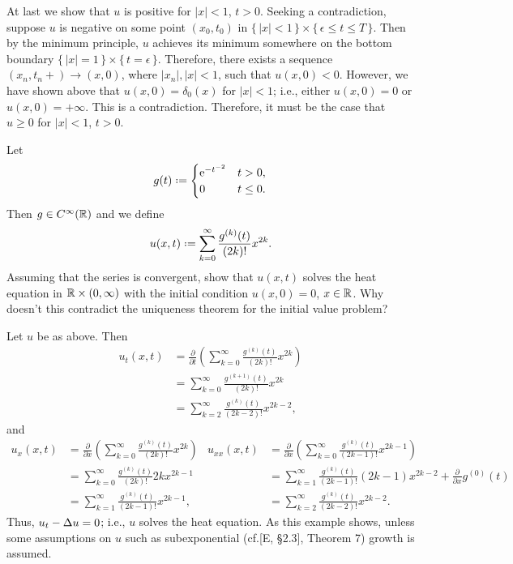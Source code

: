 \begin{solution*}
  At last we show that \(u\) is positive for \(|x|<1\), \(t>0\). Seeking a
  contradiction, suppose \(u\) is negative on some point \((x_0,t_0)\) in
  \(\{\,|x|<1\,\}\times\{\,\epsilon\leq t\leq T\,\}\). Then by the
  minimum principle, \(u\) achieves its minimum somewhere on the bottom
  boundary \(\{\,|x|=1\,\}\times\{\,t=\epsilon\,\}\). Therefore, there
  exists a sequence \((x_n,t_n{+})\to (x,0)\), where \(|x_n|,|x|<1\),
  such that \(u(x,0)<0\). However, we have shown above that
  \(u(x,0)=\delta_0(x)\) for \(|x|<1\); i.e., either \(u(x,0)=0\) or
  \(u(x,0)=+\infty\). This is a contradiction. Therefore, it must be the
  case that \(u\geq 0\) for \(|x|<1\), \(t>0\).
\end{solution*}

\begin{problem}
  Let
  \[
    g(t)\defeq
    \begin{cases}
      \rme^{-t^{-2}}&t>0,\\
      0&t\leq 0.
    \end{cases}
  \]
  Then \(g\in C^\infty(\mathbb{R})\) and we define
  \[
    u(x,t)\defeq\sum_{k=0}^\infty\frac{g^{(k)}(t)}{(2k)!}x^{2k}.
  \]
  Assuming that the series is convergent, show that \(u(x,t)\) solves the
  heat equation in \(\mathbb{R}\times(0,\infty)\) with the initial condition
  \(u(x,0)=0\), \(x\in\mathbb{R}\). Why doesn't this contradict the uniqueness
  theorem for the initial value problem?
\end{problem}
\begin{solution*}
  Let \(u\) be as above. Then
  \begin{align*}
    u_t(x,t)
    &=\frac{\partial}{\partial t}
      \left(
      \sum_{k=0}^\infty\frac{g^{(k)}(t)}{(2k)!}x^{2k}
      \right)\\
    &=\sum_{k=0}^\infty \frac{g^{(k+1)}(t)}{(2k)!}x^{2k}\\
    &=\sum_{k=2}^\infty \frac{g^{(k)}(t)}{(2k-2)!}x^{2k-2},
  \end{align*}
  and
  \begin{align*}
    u_x(x,t)
    &=\frac{\partial}{\partial x}
      \left(
      \sum_{k=0}^\infty\frac{g^{(k)}(t)}{(2k)!}x^{2k}
      \right)
    &u_{xx}(x,t)
    &=\frac{\partial}{\partial x}
      \left(
      \sum_{k=0}^\infty\frac{g^{(k)}(t)}{(2k-1)!}x^{2k-1}
      \right)\\
    &=\sum_{k=0}^\infty\frac{g^{(k)}(t)}{(2k)!} 2kx^{2k-1}
    &&=\sum_{k=1}^\infty \frac{g^{(k)}(t)}{(2k-1)!}(2k-1)x^{2k-2}
       +\frac{\partial}{\partial x}g^{(0)}(t)\\
    &=\sum_{k=1}^\infty\frac{g^{(k)}(t)}{(2k-1)!}x^{2k-1},
    &&=\sum_{k=2}^\infty\frac{g^{(k)}(t)}{(2k-2)!}x^{2k-2}.
  \end{align*}
  Thus, \(u_t-\Delta u=0\); i.e., \(u\) solves the heat equation. As this
  example shows, unless some assumptions on \(u\) such as subexponential
  (cf.\@ [E, \S 2.3], Theorem 7) growth is assumed.
\end{solution*}

